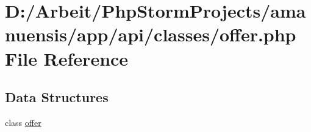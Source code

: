 \hypertarget{a00068}{}\section{D\+:/\+Arbeit/\+Php\+Storm\+Projects/amanuensis/app/api/classes/offer.php File Reference}
\label{a00068}
\subsection*{Data Structures}
\begin{DoxyCompactItemize}
\item 
class \hyperlink{a00032}{offer}
\end{DoxyCompactItemize}

